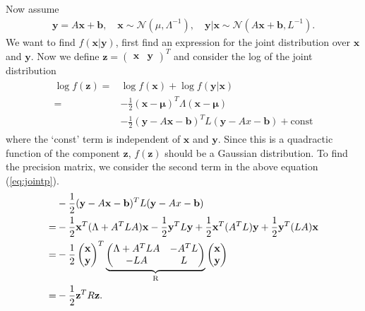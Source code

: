 {Now assume
\begin{align}
\mathbf{y}=A\mathbf{x}+\mathbf{b}, \quad \mathbf{x}\sim\mathcal{N}(\mu,\Lambda^{-1}),\quad \mathbf{y}|\mathbf{x}\sim\mathcal{N}(A\mathbf{x}+\mathbf{b},L^{-1}).
\end{align}
We want to find $f(\mathbf{x}|\mathbf{y})$, first find an expression for the joint distribution over $\mathbf{x}$ and $\mathbf{y}$. Now we define 
$\mathbf{z} = \begin{pmatrix} \mathbf{x} & \mathbf{y} \end{pmatrix}^{T}$
and consider the log of the joint distribution
\begin{align}
\begin{split}
\log f(\mathbf{z}) = &  \log f(\mathbf{x}) + \log f(\mathbf{y}|\mathbf{x}) \\
     = 	&-\frac{1}{2}(\mathbf{x}-\mathbf{\mu})^T\Lambda(\mathbf{x}-\mathbf{\mu}) \\
     	& -\frac{1}{2}(\mathbf{y}-A\mathbf{x}-\mathbf{b})^TL(\mathbf{y}-Ax-\mathbf{b}) + \text{const}
\end{split}
\label{eq:jointp}
\end{align}
where the `const' term is independent of $\mathbf{x}$ and $\mathbf{y}$. Since this is a quadractic function of the component $\mathbf{z}$, $f(\mathbf{z})$ should be a Gaussian distribution. To find the precision matrix, we consider the second term in the above equation (\ref{eq:jointp}). 
\begin{align}
\begin{split}
& -\frac{1}{2}(\mathbf{y}-A\mathbf{x}-\mathbf{b})^TL(\mathbf{y}-Ax-\mathbf{b})\\
     = & -\frac{1}{2}\mathbf{x}^T(\Lambda+A^TLA)\mathbf{x}-\frac{1}{2}\mathbf{y}^{T}L\mathbf{y}+\frac{1}{2}\mathbf{x}^T(A^TL)\mathbf{y}+\frac{1}{2}\mathbf{y}^T(LA)\mathbf{x} \\
     =	& -\frac{1}{2}\begin{pmatrix} \mathbf{x} \\ \mathbf{y} \end{pmatrix}^T\underbrace {\begin{pmatrix} 
        \Lambda+A^{T}LA &-A^{T}L  \\
        -LA & L 
        \end{pmatrix}}_{\text R}\begin{pmatrix} \mathbf{x} \\ \mathbf{y} \end{pmatrix}\\
     = & -\frac{1}{2}\mathbf{z}^TR\mathbf{z}.

\end{split}
\end{align}}
